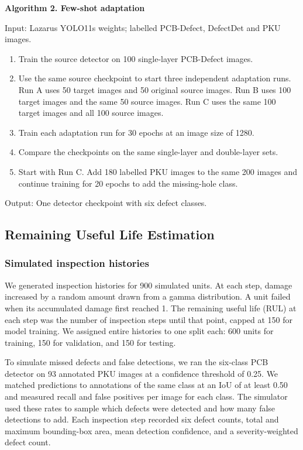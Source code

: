 \documentclass[conference]{IEEEtran}
\begin{document}
\noindent\textbf{Algorithm 2. Few-shot adaptation}\par
Input: Lazarus YOLO11s weights; labelled PCB-Defect, DefectDet and PKU images.
\begin{enumerate}
\item Train the source detector on 100 single-layer PCB-Defect images.
\item Use the same source checkpoint to start three independent adaptation runs.
  Run A uses 50 target images and 50 original source images.
  Run B uses 100 target images and the same 50 source images.
  Run C uses the same 100 target images and all 100 source images.
\item Train each adaptation run for 30 epochs at an image size of 1280.
\item Compare the checkpoints on the same single-layer and double-layer sets.
\item Start with Run C. Add 180 labelled PKU images to the same 200 images
  and continue training for 20 epochs to add the missing-hole class.
\end{enumerate}
\noindent Output: One detector checkpoint with six defect classes.

\subsection{Remaining Useful Life Estimation}

\subsubsection{Simulated inspection histories}

We generated inspection histories for 900 simulated units. At each step, damage increased by a random amount drawn from a gamma distribution. A unit failed when its accumulated damage first reached 1. The remaining useful life (RUL) at each step was the number of inspection steps until that point, capped at 150 for model training. We assigned entire histories to one split each: 600 units for training, 150 for validation, and 150 for testing.

To simulate missed defects and false detections, we ran the six-class PCB detector on 93 annotated PKU images at a confidence threshold of 0.25. We matched predictions to annotations of the same class at an IoU of at least 0.50 and measured recall and false positives per image for each class. The simulator used these rates to sample which defects were detected and how many false detections to add. Each inspection step recorded six defect counts, total and maximum bounding-box area, mean detection confidence, and a severity-weighted defect count.
\end{document}
